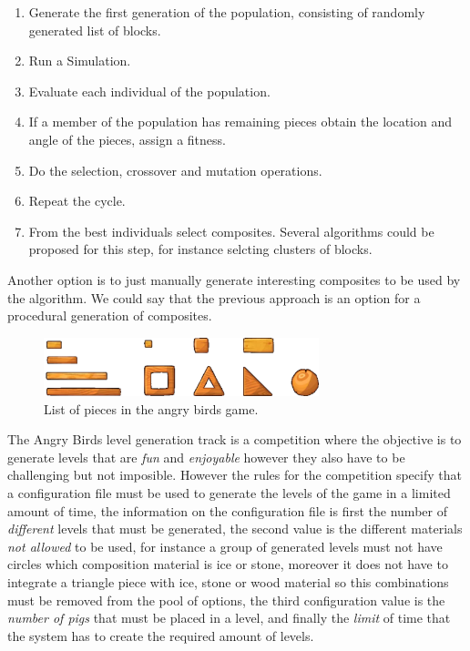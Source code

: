 \documentclass[conference]{IEEEtran}
\begin{document}
    
    \begin{enumerate}
    \item Generate the first generation of the population, consisting of
    randomly generated list of blocks.
    \item Run a Simulation.
    \item Evaluate each individual of the population.
    \item If a member of the population has remaining pieces obtain the location
    and angle of the pieces, assign a fitness.
    \item Do the selection, crossover and mutation operations.
    \item Repeat the cycle.
    \item From the best individuals select composites. Several algorithms could
    be proposed for this step, for instance selcting clusters of blocks.
    \end{enumerate}
    
    Another option is to just manually generate interesting composites to be used by the algorithm.
    We could say that the previous approach is an option for a procedural generation of composites.

    \begin{figure}[htbp]
    \centerline{\includegraphics[width=80mm]{Images/list_pieces.png}}
    \caption{List of pieces in the angry birds game.}
    \label{piece_list}
    \end{figure}
    
    
    The Angry Birds level generation track is a competition where the objective is 
    to generate levels that are \textit{fun} and \textit{enjoyable} however they 
    also have to be challenging but not imposible. However the rules for the competition 
    specify that a configuration file must be used to
    generate the levels of the game in a limited amount of time, the information on
    the configuration file is first the number of \textit{different} levels
    that must be generated, the second value is the different materials \textit{not
    allowed} to be used, for instance a group of generated levels must not have
    circles which composition material is ice or stone, moreover it does not have to
    integrate a triangle piece with ice, stone or wood material so this combinations
    must be removed from the pool of options, the third configuration value is the
    \textit{number of pigs} that must be placed in a level, and finally the
    \textit{limit} of time that the system has to create the required amount of
    levels.
    
\end{document}
